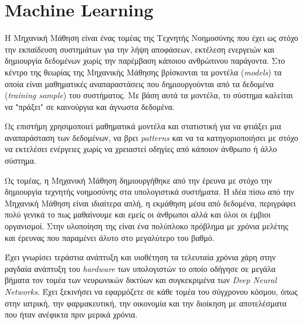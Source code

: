 \thispagestyle{empty}

\chapter{Machine Learning}

Η Μηχανική Μάθηση είναι ένας τομέας της Τεχνητής Νοημοσύνης που έχει ως στόχο την εκπαίδευση συστημάτων για την λήψη αποφάσεων, εκτέλεση ενεργειών και δημιουργία δεδομένων χωρίς την παρέμβαση κάποιου ανθρώπινου παράγοντα. Στο κέντρο της θεωρίας της Μηχανικής Μάθησης βρίσκονται τα μοντέλα (\textit{models}) τα οποία είναι μαθηματικές αναπαραστάσεις που δημιουργούνται από τα δεδομένα (\textit{training sample}) του συστήματος. Με βάση αυτά τα μοντέλα, το σύστημα καλείται να "πράξει" σε καινούργια και άγνωστα δεδομένα.
\par
Ως επιστήμη χρησιμοποιεί μαθηματικά μοντέλα και στατιστική για να φτιάξει μια αναπαράσταση των δεδομένων, να βρει \textit{patterns} και να τα κατηγοριοποιήσει με στόχο να εκτελέσει ενέργειες χωρίς να χρειαστεί οδηγίες από κάποιον άνθρωπο ή άλλο σύστημα.
\par
Ως τομέας, η Μηχανική Μάθηση δημιουργήθηκε από την έρευνα με στόχο την δημιουργία τεχνητής νοημοσύνης στα υπολογιστικά συστήματα. Η ιδέα πίσω από την Μηχανική Μάθηση είναι ιδιαίτερα απλή, η εκμάθηση μέσα από δεδομένα, περιγράφει πολύ γενικά το πως μαθαίνουμε και εμείς οι άνθρωποι αλλά και όλοι οι έμβιοι οργανισμοί. Στην υλοποίηση της είναι ένα πολύπλοκο πρόβλημα με χρόνια μελέτης και έρευνας που παραμένει άλυτο στο μεγαλύτερο του βαθμό.
\par
Έχει γνωρίσει τεράστια ανάπτυξη και υιοθέτηση τα τελευταία χρόνια χάρη στην ραγδαία ανάπτυξη του \textit{hardware} των υπολογιστών το οποίο οδήγησε σε μεγάλα βήματα τον τομέα των νευρωνικών δικτύων και συγκεκριμένα των \textit{Deep Neural Networks}. Έχει ξεκινήσει να εφαρμόζετε σε κάθε τομέα του σύγχρονου κόσμου, όπως στην ιατρική, την φαρμακευτική, την οικονομία και την διοίκηση με αποτελέσματα που ήταν ανέφικτα πριν μερικά χρόνια. \cite{mlintro}


